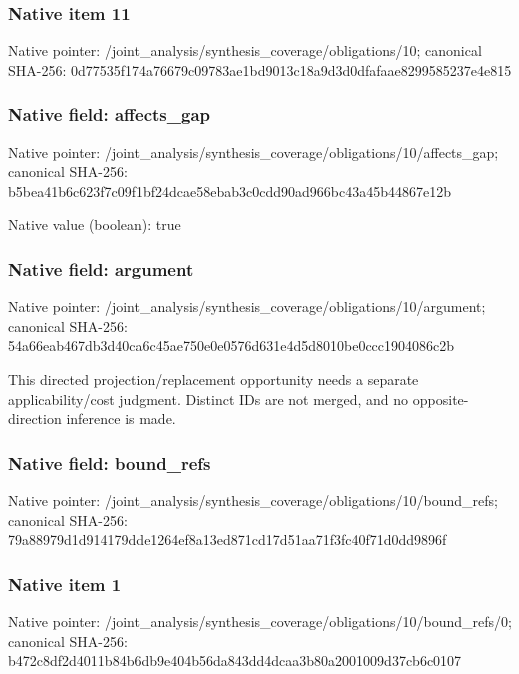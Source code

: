 \documentclass[10pt,a4paper]{article}
\begin{document}
\subsubsection{Native item 11}
Native pointer: /joint\_\allowbreak{}analysis/synthesis\_\allowbreak{}coverage/obligations/10; canonical SHA-256: 0d77535f174a76679c09783ae1bd9013c18a9d3d0dfafaae8299585237e4e815

\subsubsection{Native field: affects\_\allowbreak{}gap}
Native pointer: /joint\_\allowbreak{}analysis/synthesis\_\allowbreak{}coverage/obligations/10/affects\_\allowbreak{}gap; canonical SHA-256: b5bea41b6c623f7c09f1bf24dcae58ebab3c0cdd90ad966bc43a45b44867e12b

Native value (boolean): true

\subsubsection{Native field: argument}
Native pointer: /joint\_\allowbreak{}analysis/synthesis\_\allowbreak{}coverage/obligations/10/argument; canonical SHA-256: 54a66eab467db3d40ca6c45ae750e0e0576d631e4d5d8010be0ccc1904086c2b

\begingroup\raggedright\sloppy This directed projection/\allowbreak{}replacement opportunity needs a separate applicability/\allowbreak{}cost judgment. Distinct IDs are not merged,\allowbreak{} and no opposite-direction inference is made.\par\endgroup

\subsubsection{Native field: bound\_\allowbreak{}refs}
Native pointer: /joint\_\allowbreak{}analysis/synthesis\_\allowbreak{}coverage/obligations/10/bound\_\allowbreak{}refs; canonical SHA-256: 79a88979d1d914179dde1264ef8a13ed871cd17d51aa71f3fc40f71d0dd9896f

\subsubsection{Native item 1}
Native pointer: /joint\_\allowbreak{}analysis/synthesis\_\allowbreak{}coverage/obligations/10/bound\_\allowbreak{}refs/0; canonical SHA-256: b472c8df2d4011b84b6db9e404b56da843dd4dcaa3b80a2001009d37cb6c0107
\end{document}
